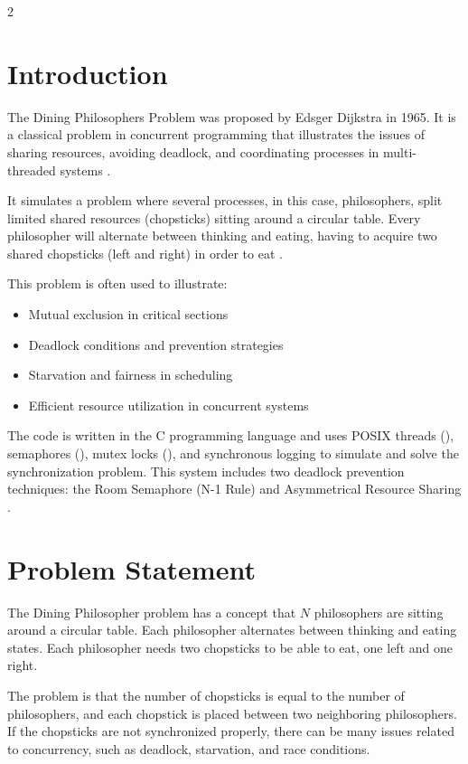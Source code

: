 \documentclass[11pt,a4paper]{article}
\newcommand{\code}[1]{\tcbox[on line, boxsep=1pt, left=1pt, right=1pt, top=1pt, bottom=1pt, colback=inlinegray, colframe=inlinegray, fontupper=\ttfamily\small]{#1}}
\begin{document}
\begin{multicols*}{2}

\section{Introduction}
The Dining Philosophers Problem was proposed by Edsger Dijkstra in 1965. It is a classical problem in concurrent programming that illustrates the issues of sharing resources, avoiding deadlock, and coordinating processes in multi-threaded systems \cite{geeks_problem}.

It simulates a problem where several processes, in this case, philosophers, split limited shared resources (chopsticks) sitting around a circular table. Every philosopher will alternate between thinking and eating, having to acquire two shared chopsticks (left and right) in order to eat \cite{dining_theory}.

This problem is often used to illustrate:
\begin{itemize}
    \item Mutual exclusion in critical sections
    \item Deadlock conditions and prevention strategies
    \item Starvation and fairness in scheduling
    \item Efficient resource utilization in concurrent systems
\end{itemize}

The code is written in the C programming language and uses POSIX threads (\code{pthread}), semaphores (\code{sem\_t}), mutex locks (\code{pthread\_mutex}), and synchronous logging to simulate and solve the synchronization problem. This system includes two deadlock prevention techniques: the Room Semaphore (N-1 Rule) and Asymmetrical Resource Sharing \cite{downey2016}.

\section{Problem Statement}
The Dining Philosopher problem has a concept that $N$ philosophers are sitting around a circular table. Each philosopher alternates between thinking and eating states. Each philosopher needs two chopsticks to be able to eat, one left and one right.

The problem is that the number of chopsticks is equal to the number of philosophers, and each chopstick is placed between two neighboring philosophers. If the chopsticks are not synchronized properly, there can be many issues related to concurrency, such as deadlock, starvation, and race conditions.


\end{multicols*}
\end{document}
